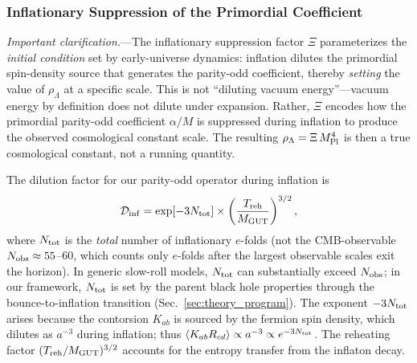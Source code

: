 \documentclass[aps,prd,twocolumn,superscriptaddress,showpacs,preprintnumbers,nofootinbib,longbibliography,floatfix]{revtex4-2}
\newcommand{\Dinf}{\mathcal{D}_{\rm inf}}
\newcommand{\MPl}{M_{\rm Pl}}
\begin{document}
\subsubsection{Inflationary Suppression of the Primordial Coefficient}\label{sec:dilution}

\textit{Important clarification.}---The inflationary suppression factor $\Xi$ parameterizes the \textit{initial condition} set by early-universe dynamics: inflation dilutes the primordial spin-density source that generates the parity-odd coefficient, thereby \textit{setting} the value of $\rho_\Lambda$ at a specific scale. This is not ``diluting vacuum energy''---vacuum energy by definition does not dilute under expansion. Rather, $\Xi$ encodes how the primordial parity-odd coefficient $\alpha/M$ is suppressed during inflation to produce the observed cosmological constant scale. The resulting $\rho_\Lambda = \Xi\,\MPl^4$ is then a true cosmological constant, not a running quantity.

The dilution factor for our parity-odd operator during inflation is
\begin{equation}\label{eq:Dinf}
\Dinf = \exp[-3N_{\rm tot}] \times \left(\frac{T_{\rm reh}}{M_{\rm GUT}}\right)^{3/2},
\end{equation}
where $N_{\rm tot}$ is the \textit{total} number of inflationary $e$-folds (not the CMB-observable $N_{\rm obs}\approx 55$--$60$, which counts only $e$-folds after the largest observable scales exit the horizon). In generic slow-roll models, $N_{\rm tot}$ can substantially exceed $N_{\rm obs}$; in our framework, $N_{\rm tot}$ is set by the parent black hole properties through the bounce-to-inflation transition (Sec.~\ref{sec:theory_program}). The exponent $-3N_{\rm tot}$ arises because the contorsion $K_{ab}$ is sourced by the fermion spin density, which dilutes as $a^{-3}$ during inflation; thus $\langle K_{ab}R_{cd}\rangle \propto a^{-3} \propto e^{-3N_{\rm tot}}$. The reheating factor $(T_{\rm reh}/M_{\rm GUT})^{3/2}$ accounts for the entropy transfer from the inflaton decay.
\end{document}
